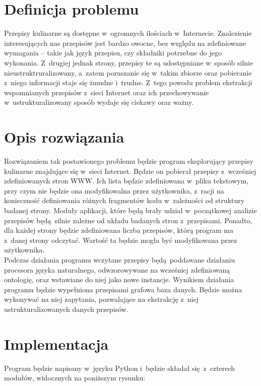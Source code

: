 \documentclass[11pt,a4paper]{article}
\begin{document}
\section{Definicja problemu}
Przepisy kulinarne są dostępne w~ogromnych ilościach w~Internecie. Znalezienie interesujących nas przepisów jest bardzo owocne, bez względu na zdefiniowane wymagania -- takie jak język przepisu, czy składniki potrzebne do jego wykonania. Z~drugiej jednak strony, przepisy te są udostępniane w~sposób silnie nieustruktruralizowany, a~zatem poruszanie się w~takim zbiorze oraz pobieranie z~niego informacji staje się żmudne i~trudne. Z~tego powodu problem ekstrakcji wspomnianych przepisów z~sieci Internet oraz ich przechowywanie w~ustrukturalizowany sposób wydaje się ciekawy oraz ważny.

\section{Opis rozwiązania}
Rozwiązaniem tak postawionego problemu będzie program eksplorujący przepisy kulinarne znajdujące się w~sieci Internet. Będzie on pobierał przepisy z~wcześniej zdefiniowanych stron WWW. Ich lista będzie zdefiniowana w~pliku tekstowym, przy czym nie będzie ona modyfikowalna przez użytkownika, z~racji na konieczność definiowania różnych fragmentów kodu w~zależności od struktury badanej strony. Moduły aplikacji, które będą brały udział w~początkowej analizie przepisów będą silnie zależne od układu badanych stron z~przepisami. Ponadto, dla każdej strony będzie zdefiniowana liczba przepisów, którą program ma z~danej strony odczytać. Wartość ta będzie mogła być modyfikowana przez użytkownika.\\

Podczas działania programu wczytane przepisy będą poddawane działaniu procesora języka naturalnego, odwzorowywane na wcześniej zdefiniowaną ontologię, oraz wstawiane do niej jako nowe instancje. Wynikiem działania programu będzie wypełniona przepisami grafowa baza danych. Będzie można wykonywać na niej zapytania, pozwalające na ekstrakcję z~niej ustrukturalizowanych danych przepisów.

\section{Implementacja}
Program będzie napisany w~języku Python i~będzie składał się z~czterech modułów, widocznych na poniższym rysunku:\\

\end{document}
